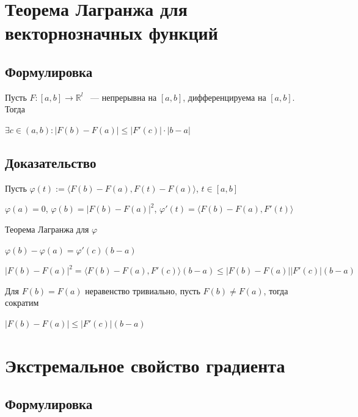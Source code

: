 \documentclass{article}
\begin{document}
    \newpage
    
    \section{Теорема Лагранжа для векторнозначных функций}
    
        \subsection{Формулировка}
        
            Пусть $F: [a, b] \rightarrow \mathbb{R}^l$ ~--- непрерывна на $[a, b]$, дифференцируема на $[a, b]$. Тогда
            
            $\exists c \in (a, b) : \left| F(b) - F(a) \right| \leq \left| F'(c) \right| \cdot |b - a|$
            
        \subsection{Доказательство}
        
            Пусть $\varphi(t) := \langle F(b) - F(a), F(t) - F(a) \rangle$, $t \in [a, b]$
            
            $\varphi(a) = 0$, $\varphi(b) = |F(b) - F(a)|^2$, $\varphi'(t) = \langle F(b) - F(a), F'(t) \rangle$
            
            Теорема Лагранжа для $\varphi$
            
            $\varphi(b) - \varphi(a) = \varphi'(c)(b - a)$
            
            $\left| F(b) - F(a) \right|^2 = \langle F(b) - F(a), F'(c) \rangle(b - a) \leq \left| F(b) - F(a) \right| \left| F'(c) \right|(b - a)$
            
            Для $F(b) = F(a)$ неравенство тривиально, пусть $F(b) \neq F(a)$, тогда сократим
            
            $\left| F(b) - F(a) \right| \leq \left| F'(c) \right| (b - a)$
            
            
    \newpage
    
    \section{Экстремальное свойство градиента}
    
        \subsection{Формулировка}
        
\end{document}
